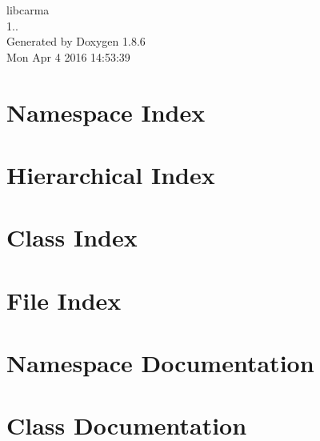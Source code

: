 \documentclass[twoside]{book}
\newcommand{\clearemptydoublepage}{%
  \newpage{\pagestyle{empty}\cleardoublepage}%
}
\begin{document}
\hypersetup{pageanchor=false}
\begin{titlepage}
\vspace*{7cm}
\begin{center}%
{\Large libcarma \\[1ex]\large 1.. }\\
\vspace*{1cm}
{\large Generated by Doxygen 1.8.6}\\
\vspace*{0.5cm}
{\small Mon Apr 4 2016 14:53:39}\\
\end{center}
\end{titlepage}
\clearemptydoublepage
\tableofcontents
\clearemptydoublepage
{}
\hypersetup{pageanchor=true}

\chapter{Namespace Index}

\chapter{Hierarchical Index}

\chapter{Class Index}

\chapter{File Index}

\chapter{Namespace Documentation}









\chapter{Class Documentation}













\end{document}
